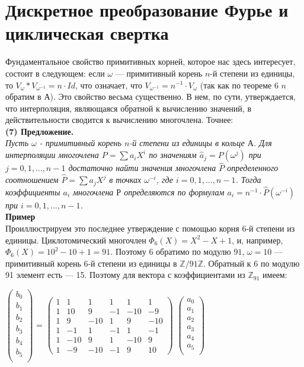 \documentclass{mai_book}
\begin{document}
\section{ Дискретное преобразование Фурье
и циклическая свертка}
Фундаментальное свойство примитивных корней, которое нас здесь
интересует, состоит в следующем: если $\omega$ — примитивный корень
$n$-й степени из единицы, то $V_\omega \ast V_{\omega^{-1}} = n\cdot Id$, что означает, что
$ V_{\omega^{-1}} = n^{-1}\cdot V_\omega  $ (так как по теореме 6 $n$ обратим в $А$). Это свойство
весьма существенно. В нем, по сути, утверждается, что интерполяция,
являющаяся обратной к вычислению значений, в действительности 
сводится к вычислению многочлена. Точнее: \bigskip \\
\textbf{(7) Предложение.} \bigskip \\
\textit{Пусть $\omega$ - примитивный корень $n$-й степени из единицы в кольце $А$.
Для интерполяции многочлена $P = \sum a_i X^i$ по значениям
$\hat{a}_j = P(\omega^j)$ при $j = 0,1,...,n - 1$ достаточно найти значения 
многочлена $\hat{P}$ определенного соотношением $\hat{P} = \sum a_j X^j$ в точках $\omega^{-i}$, где
$i = 0,1,...,n - 1$. Тогда коэффициенты $a_i$ многочлена $Р$ определяются
по формулам $a_i = n^{-1} \cdot \hat{P}(\omega^{-i})$ при $i = 0,1,..., n - 1$.}\bigskip \\
\textbf{Пример} \\
Проиллюстрируем это последнее утверждение с помощью корня $6$-й
степени из единицы. Циклотомический многочлен $\Phi_6(X) = X^2 - X + 1$,
и, например, $\Phi_6(X) = 10^2 - 10 + 1 = 91$. Поэтому $6$ обратимо по 
модулю $91$, $\omega = 10$ — примитивный корень 6-й степени из единицы в $\mathbb{Z} / 91 \mathbb{Z}$.
Обратный к 6 по модулю 91 элемент есть — 15. Поэтому для вектора
с коэффициентами из $\mathbb{Z}_{91}$ имеем: \\
\begin{center}
$\begin{pmatrix}
b_0\\
b_1\\
b_2\\
b_3\\
b_4\\
b_5\\
\end{pmatrix}$ =
$\begin{pmatrix}
1 & 1 & 1 & 1 & 1 & 1\\
1 & 10 & 9 & -1 & -10 & -9\\
1 & 9 & -10 & 1 & 9 & -10\\
1 & -1 & 1 & -1 &1 & -1\\
1 & -10 & 9 & 1 & -10 & 9\\
1 & -9 & -10 & -1 & 9 & 10
\end{pmatrix}$
$\begin{pmatrix}
a_0\\
a_1\\
a_2\\
a_3\\
a_4\\
a_5\\
\end{pmatrix}$
\end{center}
\end{document}

